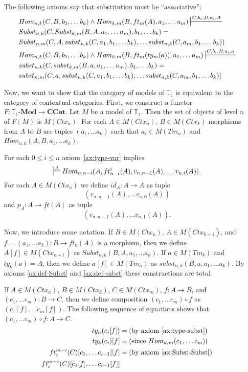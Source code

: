\documentclass[reqno]{amsart}
\theoremstyle{definition}
\theoremstyle{remark}
\newcommand{\cat}[1]{\mathbf{#1}}
\newcommand{\ccat}{\cat{CCat}}
\newcommand{\Mod}[1]{#1\text{-}\cat{Mod}}
\numberwithin{figure}{section}
\begin{document}
The following axioms say that substitution must be ``associative'':
\begin{align}
\label{ax:Subst-Subst}
& Hom_{n,k}(C, B, b_1, \ldots b_k) \land Hom_{k,m}(B, ft_m(A), a_1, \ldots a_m) \sststile{}{C, b_i, B, a_i, A} \\ \notag
& Subst_{n,k}(C, Subst_{k,m}(B, A, a_1, \ldots a_m), b_1, \ldots b_k) = \\ \notag
& Subst_{n,m}(C, A, subst_{n,k}(C, a_1, b_1, \ldots b_k), \ldots subst_{n,k}(C, a_m, b_1, \ldots b_k)) \\
\label{ax:subst-subst}
& Hom_{n,k}(C, B, b_1, \ldots b_k) \land Hom_{k,m}(B, ft_m(ty_m(a)), a_1, \ldots a_m) \sststile{}{C, b_i, B, a_i, a} \\ \notag
& subst_{n,k}(C, subst_{k,m}(B, a, a_1, \ldots a_m), b_1, \ldots b_k) = \\ \notag
& subst_{n,m}(C, a, subst_{n,k}(C, a_1, b_1, \ldots b_k), \ldots subst_{n,k}(C, a_m, b_1, \ldots b_k))
\end{align}

Now, we want to show that the category of models of $\mathbb{T}_1$ is equivalent to the category of contextual categories.
First, we construct a functor $F : \Mod{\mathbb{T}_1} \to \ccat$.
Let $M$ be a model of $\mathbb{T}_1$.
Then the set of objects of level $n$ of $F(M)$ is $M(Ctx_n)$.
For each $A \in M(Ctx_n)$, $B \in M(Ctx_k)$ morphisms from $A$ to $B$ are tuples $(a_1, \ldots a_k)$ such that $a_i \in M(Tm_n)$ and $Hom_{n,k}(A, B, a_1, \ldots a_k)$.

For each $0 \leq i \leq n$ axiom~\eqref{ax:type-var} implies
\[ \sststile{}{A} Hom_{n,n-i}(A, ft^i_{n-i}(A), v_{n,n-1}(A), \ldots v_{n,i}(A)). \]
For each $A \in M(Ctx_n)$ we define $id_A : A \to A$ as tuple
\[ (v_{n,n-1}(A), \ldots v_{n,0}(A)) \]
and $p_A : A \to ft(A)$ as tuple
\[ (v_{n,n-1}(A), \ldots v_{n,1}(A)). \]

Now, we introduce some notation.
If $B \in M(Ctx_n)$, $A \in M(Ctx_{k+1})$, and $f = (a_1, \ldots a_k) : B \to ft_k(A)$ is a morphism, then we define $A[f] \in M(Ctx_{n+1})$ as $Subst_{n,k}(B, A, a_1, \ldots a_k)$.
If $a \in M(Tm_k)$ and $ty_k(a) = A$, then we define $a[f] \in M(Tm_n)$ as $subst_{n,k}(B, a, a_1, \ldots a_k)$.
By axioms \eqref{ax:def-Subst} and \eqref{ax:def-subst} these constructions are total.

If $A \in M(Ctx_n)$, $B \in M(Ctx_k)$, $C \in M(Ctx_m)$, $f : A \to B$, and $(c_1, \ldots c_m) : B \to C$, then we define composition $(c_1, \ldots c_m) \circ f$ as $(c_1[f], \ldots c_m[f])$.
The following sequence of equations shows that $(c_1, \ldots c_m) \circ f : A \to C$.
\begin{align*}
ty_n(c_i[f]) & = \text{(by axiom~\eqref{ax:type-subst})} \\
ty_k(c_i)[f] & = \text{(since $Hom_{k,m}(c_1, \ldots c_m)$)} \\
ft^{m-i}_i(C)[c_1, \ldots c_{i-1}][f] & = \text{(by axiom~\eqref{ax:Subst-Subst})} \\
ft^{m-i}_i(C)[c_1[f], \ldots c_{i-1}[f]] &
\end{align*}
\end{document}
